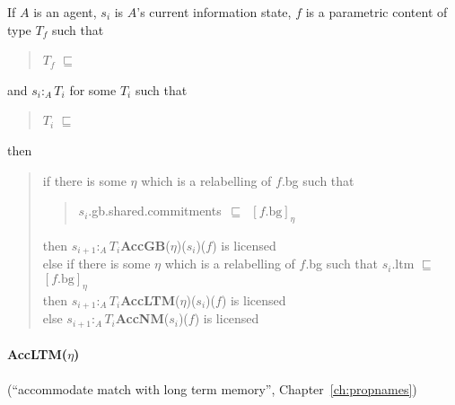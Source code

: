 If $A$ is an agent, $s_i$ is $A$'s current information state, $f$ is a
parametric content of type $T_f$ such that
\begin{quote}
$T_f$ $\sqsubseteq$ 
\end{quote}
 and
$s_i:_A T_i$ for some $T_i$ such that 
\begin{quote}
$T_i$ $\sqsubseteq$ 
\end{quote}
then \\
\begin{quote}
if there is some $\eta$ which is a relabelling of $f$.bg such that 
\begin{quote}
\mbox{$s_i$.gb.shared.commitments $\sqsubseteq$ $[f.\mathrm{bg}]_\eta$}
\end{quote}
then $s_{i+1} :_A
T_i$\fbox{\d{$\wedge$}}\textbf{AccGB}($\eta$)($s_i$)($f$) is
licensed\nopagebreak\\[\baselineskip]
else if there is some $\eta$ which is a relabelling of
$f$.bg such that $s_i$.ltm
$\sqsubseteq$ $[f.\mathrm{bg}]_\eta$\nopagebreak\\[.25\baselineskip]
then $s_{i+1} :_A
T_i$\fbox{\d{$\wedge$}}\textbf{AccLTM}($\eta$)($s_i$)($f$) is
licensed\nopagebreak\\[\baselineskip] 
else $s_{i+1} :_A
T_i$\fbox{\d{$\wedge$}}\textbf{AccNM}($s_i$)($f$) is
licensed
\end{quote} 




\paragraph{\textbf{AccLTM}($\eta$)} (``accommodate match with long
term memory'', Chapter~\ref{ch:propnames})\nopagebreak

